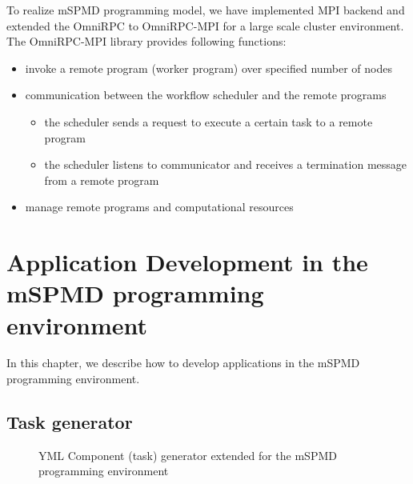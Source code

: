 \documentclass[graybox]{svmult}
\begin{document}
To realize mSPMD programming model, we have implemented MPI backend and extended the OmniRPC to OmniRPC-MPI for a large scale cluster environment.  
The OmniRPC-MPI library provides following functions:
\begin{itemize}
 \item invoke a remote program (worker program) over specified number of nodes
 \item communication between the workflow scheduler and the remote programs
       \begin{itemize}
	\item the scheduler sends a request to execute a certain task to a remote program
	\item the scheduler listens to communicator and receives a termination message from a remote program
       \end{itemize}
 \item manage remote programs and computational resources
\end{itemize}

\section{Application Development in the mSPMD programming environment}

In this chapter, we describe how to develop applications in the mSPMD programming environment. 

\subsection{Task generator}

\begin{figure}[t]
 \begin{center}
  \caption{YML Component (task) generator extended for the mSPMD programming environment}
  \label{figure:task-generator}
 \end{center}
\end{figure}
\end{document}
